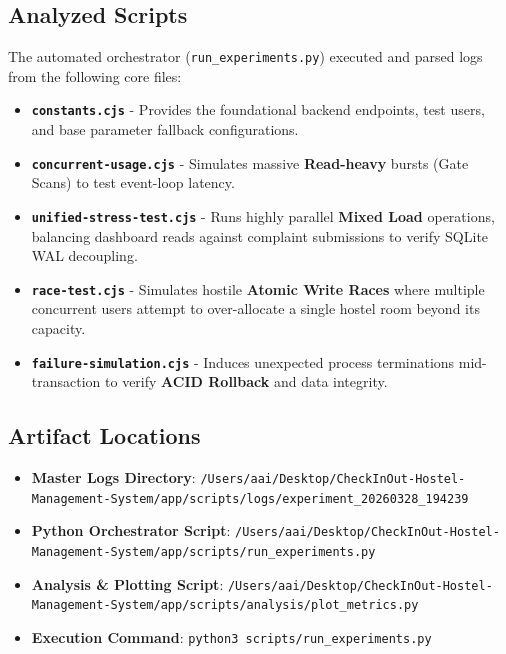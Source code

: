 \documentclass[sigconf]{acmart}
\begin{document}
\subsection{Analyzed Scripts}
The automated orchestrator (\texttt{run\_experiments.py}) executed and parsed logs from the following core files:
\begin{itemize}
    \item \textbf{\texttt{constants.cjs}} - Provides the foundational backend endpoints, test users, and base parameter fallback configurations.
    \item \textbf{\texttt{concurrent-usage.cjs}} - Simulates massive \textbf{Read-heavy} bursts (Gate Scans) to test event-loop latency.
    \item \textbf{\texttt{unified-stress-test.cjs}} - Runs highly parallel \textbf{Mixed Load} operations, balancing dashboard reads against complaint submissions to verify SQLite WAL decoupling.
    \item \textbf{\texttt{race-test.cjs}} - Simulates hostile \textbf{Atomic Write Races} where multiple concurrent users attempt to over-allocate a single hostel room beyond its capacity.
    \item \textbf{\texttt{failure-simulation.cjs}} - Induces unexpected process terminations mid-transaction to verify \textbf{ACID Rollback} and data integrity.
\end{itemize}

\subsection{Artifact Locations}
\begin{itemize}
    \item \textbf{Master Logs Directory}: \texttt{/Users/aai/Desktop/CheckInOut-Hostel-Management-System/app/scripts/logs/experiment_20260328_194239}
    \item \textbf{Python Orchestrator Script}: \texttt{/Users/aai/Desktop/CheckInOut-Hostel-Management-System/app/scripts/run_experiments.py}
    \item \textbf{Analysis \& Plotting Script}: \texttt{/Users/aai/Desktop/CheckInOut-Hostel-Management-System/app/scripts/analysis/plot_metrics.py}
    \item \textbf{Execution Command}: \texttt{python3 scripts/run_experiments.py}
\end{itemize}
\end{document}
